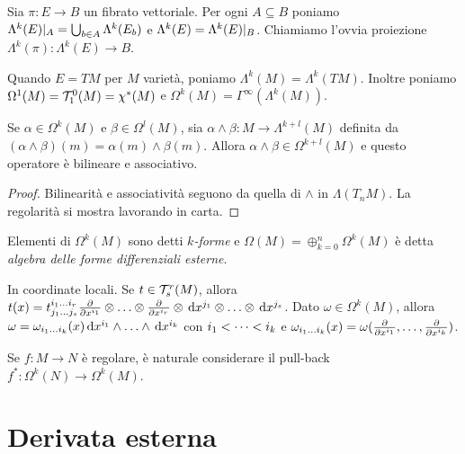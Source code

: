 \begin{definition}
	Sia $\pi : E\to B$ un fibrato vettoriale. Per ogni $A\subseteq B$ poniamo $\Lambda^k(E)\restrict{A} = \bigcup_{b\in A} \Lambda^k(E_b)$ e $\Lambda^k(E) = \Lambda^k(E) \restrict B$.
	Chiamiamo l'ovvia proiezione $\Lambda^k(\pi) : \Lambda^k(E) \to B$.
\end{definition}

Quando $E = TM$ per $M$ varietà, poniamo $\Lambda^k(M) = \Lambda^k(TM)$. Inoltre poniamo $\Omega^1(M) = \Tau^0_1(M) = \chi^*(M)$ e $\Omega^k(M) = \Gamma^\infty(\Lambda^k(M))$.

\begin{proposition}
	Se $\alpha \in \Omega^k(M)$ e $\beta \in \Omega^l(M)$, sia $\alpha \wedge \beta : M \to \Lambda^{k+l}(M)$ definita da $(\alpha\wedge\beta)(m) = \alpha(m) \wedge \beta(m)$. Allora $\alpha\wedge\beta \in \Omega^{k+l}(M)$ e questo operatore è bilineare e associativo.
\end{proposition}
\begin{proof}
	Bilinearità e associatività seguono da quella di $\wedge$ in $\Lambda(T_nM)$. La regolarità si mostra lavorando in carta.
\end{proof}

\begin{definition}
	Elementi di $\Omega^k(M)$ sono detti \emph{$k$-forme} e $\Omega(M) = \oplus_{k=0}^n \Omega^k(M)$ è detta \emph{algebra delle forme differenziali esterne}.
\end{definition}

\begin{remark}
In coordinate locali. Se $t\in\Tau^r_s(M)$, allora $t(x) = t^{\seqb ir{}}_{\seqb js{}} \DerParz{}{x^{i_1}} \otimes \ldots \otimes \DerParz{}{x^{i_r}} \otimes \de x^{j_1} \otimes \ldots \otimes \de x^{j_s}$.
Dato $\omega \in \Omega^k(M)$, allora $\omega = \omega_{\seqb ik{}}(x) \de x^{i_1} \wedge \ldots \wedge \de x^{i_k}$ con $\seqb ik<$ e $\omega_{\seqb ik{}}(x) = \omega(\DerParz{}{x^{i_1}}, \ldots, \DerParz{}{x^{i_k}})$.
\end{remark}

\begin{remark}
	Se $f:M\to N$ è regolare, è naturale considerare il pull-back $f^*: \Omega^k(N) \to \Omega^k(M)$.
\end{remark}

\section{Derivata esterna}

